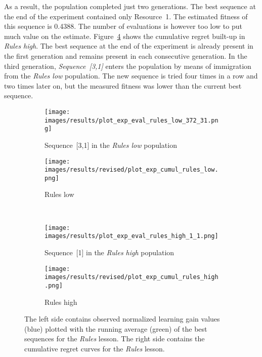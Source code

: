 As a result, the population completed just two generations. The best sequence at the
end of the experiment contained only Resource~1. The estimated fitness of this
sequence is 0.4388. The number of evaluations is however too low to put much
value on the estimate. Figure~\ref{fig:exp_cumul_rules_high} shows the
cumulative regret built-up in \emph{Rules high}. The best sequence at the end of the experiment is
already present in the first generation and remains present in each consecutive
generation. In the third generation, \emph{Sequence~[3,1]} enters the population
by means of immigration from the \emph{Rules low} population. The new sequence
is tried four times in a row and two times later on, but the measured fitness
was lower than the current best sequence.

\begin{figure}[ht]
	\centering
	\begin{subfigure}{0.6\linewidth}
	\centering
	\texttt{[image: images/results/plot\_exp\_eval\_rules\_low\_372\_31.png]}
	\caption{Sequence~[3,1] in the \emph{Rules low} population}
	\label{fig:exp_eval_rules_low_372}
	\end{subfigure}
	\hfill
	\begin{subfigure}{0.39\linewidth}
	\centering
	\texttt{[image: images/results/revised/plot\_exp\_cumul\_rules\_low.png]}
	\caption{Rules low}
	\label{fig:exp_cumul_rules_low}
	\end{subfigure}\\
	\begin{subfigure}{0.6\linewidth}
	\centering
	\texttt{[image: images/results/plot\_exp\_eval\_rules\_high\_1\_1.png]}
	\caption{Sequence~[1] in the \emph{Rules high} population}
	\label{fig:exp_eval_rules_high_1}
	\hfill
	\end{subfigure}
	\begin{subfigure}{0.39\linewidth}
	\centering
	\texttt{[image: images/results/revised/plot\_exp\_cumul\_rules\_high.png]}
	\caption{Rules high}
	\label{fig:exp_cumul_rules_high}
	\end{subfigure}
	\caption[Evaluations of best sequences and cumulative regret in
	Rules]{The left side contains observed normalized learning gain values
		(blue) plotted with the running average (green) of the best sequences
		for the \emph{Rules} lesson. The right side contains the cumulative
		regret curves for the \emph{Rules} lesson.}
	\label{fig:exp_eval_rules}
\end{figure}

